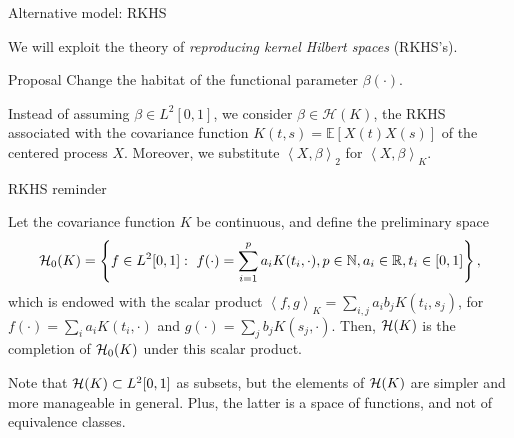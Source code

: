 \documentclass[10pt, english, professionalfonts]{beamer}
\newcommand\maroon[1]{\color{mLightBrown}#1\color{mDarkTeal}}
\newcommand{\N}{\mathbb{N}}
\newcommand{\R}{\mathbb{R}}
\newcommand{\Hcal}{\ensuremath\mathcal{H}}
\newcommand\dotprod[2]{\left\langle #1, #2 \right\rangle}
\begin{document}
\begin{frame}{Alternative model: RKHS}

We will exploit the theory of \textit{reproducing kernel Hilbert spaces} (RKHS's).

\vspace{1em}
\begin{alertblock}{Proposal}
  Change the habitat of the functional parameter \(\beta(\cdot)\).
\end{alertblock}

\vspace{1em}
  Instead of assuming \(\beta \in L^2[0, 1]\), we consider \maroon{\(\beta \in \mathcal H(K)\)}, the RKHS associated with the covariance function \(K(t, s)=\mathbb E[X(t)X(s)]\) of the centered process \(X\). Moreover, we substitute \(\dotprod{X}{\beta}_2\) for \maroon{\(\dotprod{X}{\beta}_K\)}.
\end{frame}


\begin{frame}{RKHS reminder}
  \begin{definition}
    Let the covariance function \(K\) be continuous, and define the preliminary space
    \[
    \Hcal_0(K) = \left\{ f \in L^2[0,1]: \ f(\cdot) = \sum_{i=1}^p a_i K(t_i, \cdot),  p \in \N,  a_i \in \R,  t_i \in [0, 1] \right\},
    \]
    which is endowed with the scalar product \(\dotprod{f}{g}_K = \sum_{i, j} a_i b_j K(t_i, s_j)\), for \(f(\cdot)=\sum_i a_i K(t_i, \cdot) \) and \(g(\cdot)=\sum_j b_j K(s_j, \cdot)\). Then, \(\Hcal(K)\) is the completion of \(\Hcal_0(K)\) under this scalar product.
  \end{definition}

  \vspace{1em}

  Note that \(\Hcal(K)\subset L^2[0, 1]\) as subsets, but the elements of \(\Hcal(K)\) are simpler and more manageable in general. Plus, the latter is a space of \maroon{functions}, and not of equivalence classes.
\end{frame}
\end{document}

